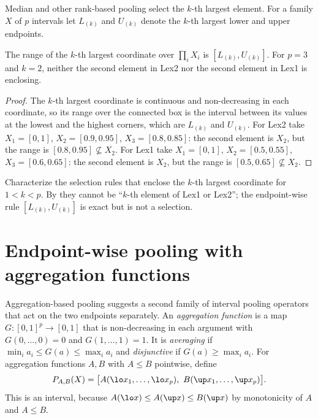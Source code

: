 Median and other rank-based pooling select the $k$-th largest element. For a family $X$ of $p$ intervals let $L_{(k)}$ and $U_{(k)}$ denote the $k$-th largest lower and upper endpoints.

\begin{proposition}\label{prop:rank}
The range of the $k$-th largest coordinate over $\prod_iX_i$ is $[L_{(k)},U_{(k)}]$. For $p=3$ and $k=2$, neither the second element in Lex2 nor the second element in Lex1 is enclosing.
\end{proposition}

\begin{proof}
The $k$-th largest coordinate is continuous and non-decreasing in each coordinate, so its range over the connected box is the interval between its values at the lowest and the highest corners, which are $L_{(k)}$ and $U_{(k)}$. For Lex2 take $X_1=[0,1]$, $X_2=[0.9,0.95]$, $X_3=[0.8,0.85]$: the second element is $X_2$, but the range is $[0.8,0.95]\not\subseteq X_2$. For Lex1 take $X_1=[0,1]$, $X_2=[0.5,0.55]$, $X_3=[0.6,0.65]$: the second element is $X_2$, but the range is $[0.5,0.65]\not\subseteq X_2$.
\end{proof}

\begin{question}
Characterize the selection rules that enclose the $k$-th largest coordinate for $1<k<p$. By  they cannot be ``$k$-th element of Lex1 or Lex2''; the endpoint-wise rule $[L_{(k)},U_{(k)}]$ is exact but is not a selection.
\end{question}

\section{Endpoint-wise pooling with aggregation functions}
\label{sec:agg}

Aggregation-based pooling \cite{rodriguez2022,rodriguez2023,forcen2020} suggests a second family of interval pooling operators that act on the two endpoints separately. An \emph{aggregation function} is a map $G:[0,1]^p\to[0,1]$ that is non-decreasing in each argument with $G(0,\dots,0)=0$ and $G(1,\dots,1)=1$. It is \emph{averaging} if $\min_ia_i\le G(a)\le\max_ia_i$ and \emph{disjunctive} if $G(a)\ge\max_ia_i$. For aggregation functions $A,B$ with $A\le B$ pointwise, define
\[
P_{A,B}(X)=\big[A(\lo x_1,\dots,\lo x_p),\ B(\up x_1,\dots,\up x_p)\big].
\]
This is an interval, because $A(\lo x)\le A(\up x)\le B(\up x)$ by monotonicity of $A$ and $A\le B$.

